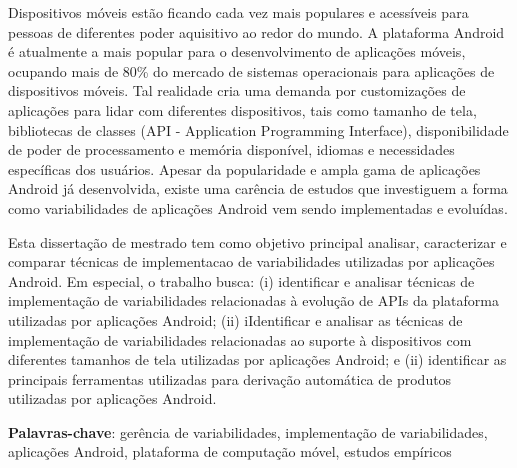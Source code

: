 \begin{resumo}

Dispositivos móveis estão ficando cada vez mais populares e acessíveis
para pessoas de diferentes poder aquisitivo ao redor do mundo. A
plataforma Android é atualmente a mais popular para o desenvolvimento
de aplicações móveis, ocupando mais de 80\% do mercado de sistemas
operacionais para aplicações de dispositivos móveis. Tal realidade
cria uma demanda por customizações de aplicações para lidar com
diferentes dispositivos, tais como tamanho de tela, bibliotecas de
classes (API - Application Programming Interface), disponibilidade de
poder de processamento e memória disponível, idiomas e necessidades
específicas dos usuários. Apesar da popularidade e ampla gama de
aplicações Android já desenvolvida, existe uma carência de estudos que
investiguem a forma como variabilidades de aplicações Android vem
sendo implementadas e evoluídas.

Esta dissertação de mestrado tem como objetivo principal analisar,
caracterizar e comparar técnicas de implementacao de variabilidades
utilizadas por aplicações Android. Em especial, o trabalho busca: (i)
identificar e analisar técnicas de implementação de variabilidades
relacionadas à evolução de APIs da plataforma utilizadas por
aplicações Android; (ii) iIdentificar e analisar as técnicas de
implementação de variabilidades relacionadas ao suporte à dispositivos
com diferentes tamanhos de tela utilizadas por aplicações Android; e
(ii) identificar as principais ferramentas utilizadas para derivação
automática de produtos utilizadas por aplicações Android.

\textbf{Palavras-chave}: gerência de variabilidades, implementação de variabilidades,
aplicações Android, plataforma de computação móvel, estudos empíricos
\end{resumo}
